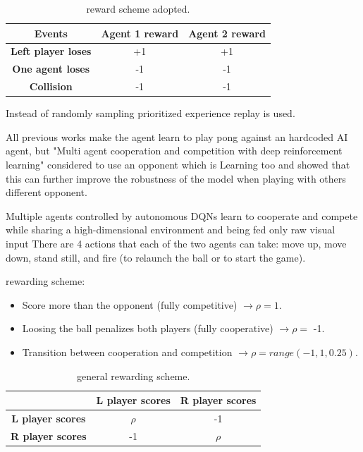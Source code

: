 \begin{table}[ht]
    \centering
    \begin{tabular}{@{}ccc@{}}
        \toprule
        \textbf{Events}            & \textbf{Agent 1 reward} & \textbf{Agent 2 reward} \\ \midrule
        \textbf{Left player loses} & +1                      & +1                      \\
        \textbf{One agent loses}   & -1                      & -1                      \\
        \textbf{Collision}         & -1                      & -1                      \\ \bottomrule
    \end{tabular}
    \label{my-table}
    \caption{reward scheme adopted.}
\end{table}

Instead of randomly sampling prioritized experience replay is used.




All previous works make the agent learn to play pong against an hardcoded AI agent, but "Multi agent cooperation and competition with deep reinforcement learning" considered to use an opponent
which is Learning too and showed that this can further improve the robustness of the model when playing with others different opponent.

Multiple agents controlled by autonomous DQNs learn to cooperate and compete while sharing a high-dimensional environment and being fed only raw visual input
There are 4 actions that each of the two agents can take: move up, move down, stand still, and fire (to relaunch the ball or to start the game).

 rewarding scheme:
\begin{itemize}
    \item Score more than the opponent (fully competitive) $\rightarrow \rho = 1$.
    \item Loosing the ball penalizes both players (fully cooperative) $\rightarrow \rho = $ -1.
    \item Transition between cooperation and competition $\rightarrow \rho = range(-1, 1, 0.25)$.
\end{itemize}

\begin{table}[ht]
    \centering
    \begin{tabular}{c|c|c|}
    \cline{2-3}
                                                   & \textbf{L player scores} & \textbf{R player scores} \\ \hline
    \multicolumn{1}{|c|}{\textbf{L player scores}} & $\rho$                       & -1                       \\ \hline
    \multicolumn{1}{|c|}{\textbf{R player scores}} & -1                       & $\rho$                        \\ \hline
    \end{tabular}
    \caption{general rewarding scheme.}
    \label{tab:my-table2}
\end{table}



